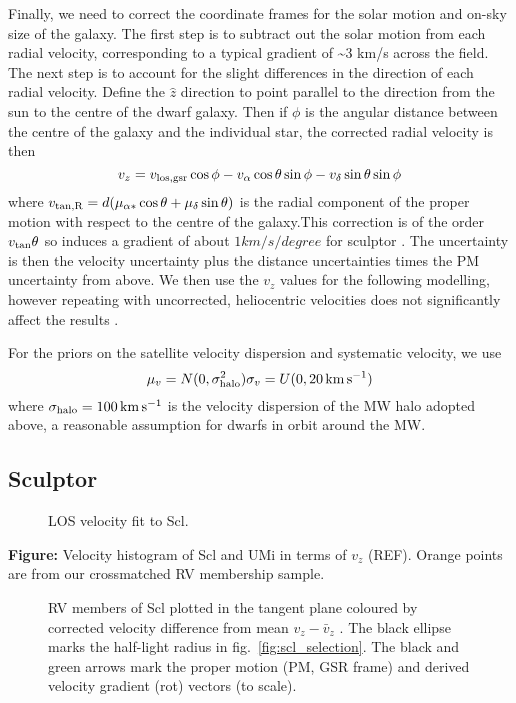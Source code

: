 Finally, we need to correct the coordinate frames for the solar motion
and on-sky size of the galaxy. The first step is to subtract out the
solar motion from each radial velocity, corresponding to a typical
gradient of \textasciitilde3 km/s across the field. The next step is to
account for the slight differences in the direction of each radial
velocity. Define the \(\hat z\) direction to point parallel to the
direction from the sun to the centre of the dwarf galaxy. Then if
\(\phi\) is the angular distance between the centre of the galaxy and
the individual star, the corrected radial velocity is then \[
v_z = v_{\rm los, gsr}\cos\phi  - v_{\alpha}\cos\theta \sin\phi - v_\delta \sin\theta\sin\phi
\] where
\(v_{\rm tan, R} = d(\mu_{\alpha*}\cos\theta + \mu_\delta \sin \theta)\)
is the radial component of the proper motion with respect to the centre
of the galaxy.This correction is of the order \(v_{\rm tan}\theta\) so
induces a gradient of about \(1 km/s/degree\) for sculptor
\citep[see][]{walker+mateo+olszewski2008}. The uncertainty is then the
velocity uncertainty plus the distance uncertainties times the PM
uncertainty from above. We then use the \(v_z\) values for the following
modelling, however repeating with uncorrected, heliocentric velocities
does not significantly affect the results .

For the priors on the satellite velocity dispersion and systematic
velocity, we use \[
\mu_{v} = N(0, \sigma_{\rm halo}^2) \\
\sigma_{v} = U(0, 20\,{\rm km\,s^{-1}})
\] where \(\sigma_{\rm halo} = 100\,{\rm km\,s^{-1}}\) is the velocity
dispersion of the MW halo adopted above, a reasonable assumption for
dwarfs in orbit around the MW.

\subsection{Sculptor}\label{sculptor}

\begin{figure}
\centering
{}
\caption{LOS velocity fit to Scl.}
\end{figure}

\textbf{Figure:} Velocity histogram of Scl and UMi in terms of \(v_z\)
(REF). Orange points are from our crossmatched RV membership sample.

\begin{figure}
\centering
{}
\caption[Scl velocity sample]{RV members of Scl plotted in the tangent
plane coloured by corrected velocity difference from mean
\(v_z - \bar v_z\) . The black ellipse marks the half-light radius in
fig.~\ref{fig:scl_selection}. The black and green arrows mark the proper
motion (PM, GSR frame) and derived velocity gradient (rot) vectors (to
scale).}
\end{figure}

